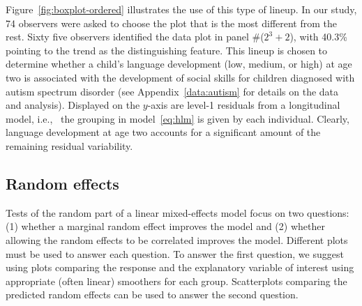 \documentclass[12pt]{article} %
\begin{document}
Figure~\ref{fig:boxplot-ordered} illustrates the use of this type of lineup. In our study, 74 observers were asked to choose the plot that is the most different from the rest. Sixty five observers identified the data plot in panel \#($2^3 + 2$), 
with 40.3\% pointing to the trend as the distinguishing feature. 
This lineup is chosen
to determine whether a child's language development (low, medium, or high) at age two  is associated with the development of social skills for children diagnosed with autism spectrum disorder (see Appendix~\ref{data:autism} for details on the data and analysis). Displayed on the $y$-axis are level-1 residuals from a longitudinal model, i.e.,~ the grouping in model~\ref{eq:hlm} is given by each individual. Clearly, language development at age two accounts for a significant amount of the remaining residual variability.




\subsection{Random effects}\label{sec:random}
Tests of the random part of a linear mixed-effects model focus on two questions: (1) whether a marginal random effect improves the model and (2) whether allowing the random effects to be correlated improves the model. Different plots must be used to answer each question. To answer the first question, we suggest using plots comparing the response and the explanatory variable of interest using appropriate (often linear) smoothers for each group. Scatterplots comparing the predicted random effects can be used to answer the second question.
\end{document}

